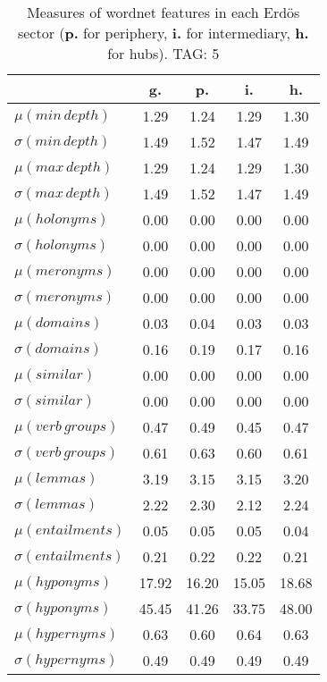 \begin{table}[h!]
\begin{center}
\begin{tabular}{| l || c | c | c | c |}\hline
 & {\bf g.} & {\bf p.} & {\bf i.} & {\bf h.} \\\hline\hline
$\mu(min\,depth)$ & 1.29  & 1.24  & 1.29  & 1.30 \\
$\sigma(min\,depth)$ & 1.49  & 1.52  & 1.47  & 1.49 \\\hline
$\mu(max\,depth)$ & 1.29  & 1.24  & 1.29  & 1.30 \\
$\sigma(max\,depth)$ & 1.49  & 1.52  & 1.47  & 1.49 \\\hline
$\mu(holonyms)$ & 0.00  & 0.00  & 0.00  & 0.00 \\
$\sigma(holonyms)$ & 0.00  & 0.00  & 0.00  & 0.00 \\\hline
$\mu(meronyms)$ & 0.00  & 0.00  & 0.00  & 0.00 \\
$\sigma(meronyms)$ & 0.00  & 0.00  & 0.00  & 0.00 \\\hline
$\mu(domains)$ & 0.03  & 0.04  & 0.03  & 0.03 \\
$\sigma(domains)$ & 0.16  & 0.19  & 0.17  & 0.16 \\\hline
$\mu(similar)$ & 0.00  & 0.00  & 0.00  & 0.00 \\
$\sigma(similar)$ & 0.00  & 0.00  & 0.00  & 0.00 \\\hline
$\mu(verb\,groups)$ & 0.47  & 0.49  & 0.45  & 0.47 \\
$\sigma(verb\,groups)$ & 0.61  & 0.63  & 0.60  & 0.61 \\\hline
$\mu(lemmas)$ & 3.19  & 3.15  & 3.15  & 3.20 \\
$\sigma(lemmas)$ & 2.22  & 2.30  & 2.12  & 2.24 \\\hline
$\mu(entailments)$ & 0.05  & 0.05  & 0.05  & 0.04 \\
$\sigma(entailments)$ & 0.21  & 0.22  & 0.22  & 0.21 \\\hline
$\mu(hyponyms)$ & 17.92  & 16.20  & 15.05  & 18.68 \\
$\sigma(hyponyms)$ & 45.45  & 41.26  & 33.75  & 48.00 \\\hline
$\mu(hypernyms)$ & 0.63  & 0.60  & 0.64  & 0.63 \\
$\sigma(hypernyms)$ & 0.49  & 0.49  & 0.49  & 0.49 \\\hline
\end{tabular}
\caption{Measures of wordnet features in each Erd\"os sector ({{\bf p.}} for periphery, {{\bf i.}} for intermediary, {{\bf h.}} for hubs). TAG: 5}
\end{center}
\end{table}